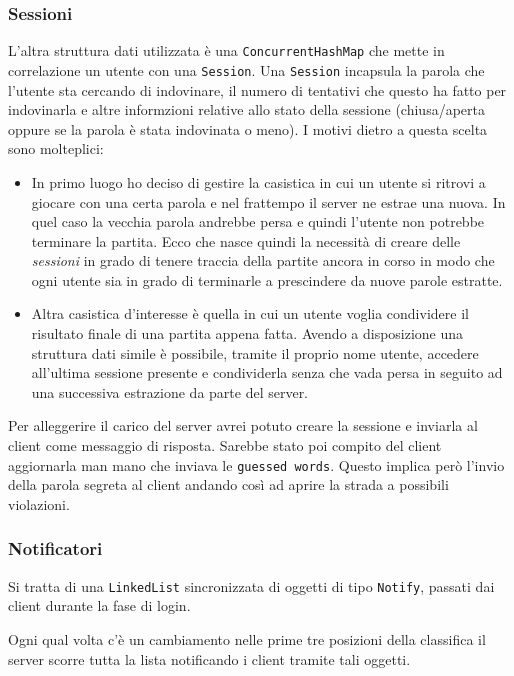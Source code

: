 \subsubsection{Sessioni}
L'altra struttura dati utilizzata è una \verb|ConcurrentHashMap| che mette in correlazione un
utente con una \verb|Session|. Una \verb|Session| incapsula la parola che l'utente sta cercando di
indovinare, il numero di tentativi che questo ha fatto per indovinarla e altre informzioni relative
allo stato della sessione (chiusa/aperta oppure se la parola è stata indovinata o meno). I motivi
dietro a questa scelta sono molteplici:
\begin{itemize}
	\item In primo luogo ho deciso di gestire la casistica in cui un utente si ritrovi a giocare
	      con una certa parola e nel frattempo il server ne estrae una nuova. In quel caso la
	      vecchia parola andrebbe persa e quindi l'utente non potrebbe terminare la partita. Ecco
	      che nasce quindi la necessità di creare delle \emph{sessioni} in grado di tenere
	      traccia della partite ancora in corso in modo che ogni utente sia in grado di
	      terminarle a prescindere da nuove parole estratte.
	\item Altra casistica d'interesse è quella in cui un utente voglia condividere il risultato
	      finale di una partita appena fatta. Avendo a disposizione una struttura dati simile è
	      possibile, tramite il proprio nome utente, accedere all'ultima sessione presente e
	      condividerla senza che vada persa in seguito ad una successiva estrazione da parte del
	      server.
\end{itemize}
Per alleggerire il carico del server avrei potuto creare la sessione e inviarla al client come
messaggio di risposta. Sarebbe stato poi compito del client aggiornarla man mano che inviava le
\verb|guessed words|. Questo implica però l'invio della parola segreta al client andando così ad
aprire la strada a possibili violazioni.

\subsubsection{Notificatori}
Si tratta di una \verb|LinkedList| sincronizzata di oggetti di tipo \verb|Notify|, passati dai
client durante la fase di login.

Ogni qual volta c'è un cambiamento nelle prime tre posizioni della classifica il server scorre
tutta la lista notificando i client tramite tali oggetti.

